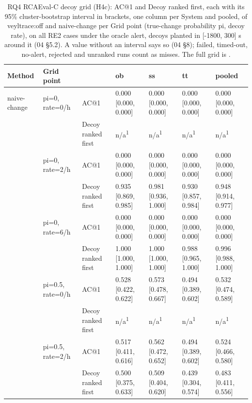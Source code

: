 \begin{table}[t]
\centering
\caption{RQ4 RCAEval-C decoy grid (H4c): AC@1 and Decoy ranked first, each with its 95\% cluster-bootstrap interval in brackets, one column per System and pooled, of veyltrace:off and naive-change per Grid point (true-change probability pi, decoy rate), on all RE2 cases under the oracle alert, decoys planted in [-1800, 300] s around it (04 \S{}5.2). A value without an interval says so (04 \S{}8); failed, timed-out, no-alert, rejected and unranked runs count as misses. The full grid is .}
\label{tab:t12-rq4-rcaevalc-paper}
\footnotesize
\setlength{\tabcolsep}{3pt}%
\begin{tabular}{@{}lllllll@{}}
\hline
Method & Grid point &  & ob & ss & tt & pooled \\
\hline
naive-change & pi=0, rate=0/h & AC@1 & 0.000 [0.000, 0.000] & 0.000 [0.000, 0.000] & 0.000 [0.000, 0.000] & 0.000 [0.000, 0.000] \\
 &  & Decoy ranked first & n/a\textsuperscript{1} & n/a\textsuperscript{1} & n/a\textsuperscript{1} & n/a\textsuperscript{1} \\
 & pi=0, rate=2/h & AC@1 & 0.000 [0.000, 0.000] & 0.000 [0.000, 0.000] & 0.000 [0.000, 0.000] & 0.000 [0.000, 0.000] \\
 &  & Decoy ranked first & 0.935 [0.869, 0.985] & 0.981 [0.936, 1.000] & 0.930 [0.857, 0.984] & 0.948 [0.914, 0.977] \\
 & pi=0, rate=6/h & AC@1 & 0.000 [0.000, 0.000] & 0.000 [0.000, 0.000] & 0.000 [0.000, 0.000] & 0.000 [0.000, 0.000] \\
 &  & Decoy ranked first & 1.000 [1.000, 1.000] & 1.000 [1.000, 1.000] & 0.988 [0.965, 1.000] & 0.996 [0.988, 1.000] \\
 & pi=0.5, rate=0/h & AC@1 & 0.528 [0.422, 0.622] & 0.573 [0.478, 0.667] & 0.494 [0.389, 0.602] & 0.532 [0.474, 0.589] \\
 &  & Decoy ranked first & n/a\textsuperscript{1} & n/a\textsuperscript{1} & n/a\textsuperscript{1} & n/a\textsuperscript{1} \\
 & pi=0.5, rate=2/h & AC@1 & 0.517 [0.411, 0.616] & 0.562 [0.472, 0.652] & 0.494 [0.389, 0.602] & 0.524 [0.466, 0.580] \\
 &  & Decoy ranked first & 0.500 [0.375, 0.633] & 0.509 [0.404, 0.620] & 0.439 [0.304, 0.574] & 0.483 [0.411, 0.556] \\

\end{tabular}
\end{table}
